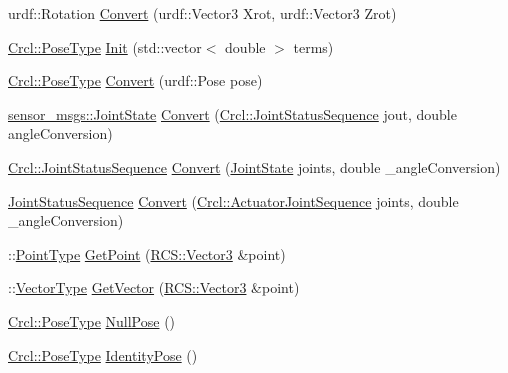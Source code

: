 \begin{DoxyCompactItemize}
\item 
urdf\-::\-Rotation \hyperlink{namespaceCrcl_af82af80892b5c9a1f843bbfabd06de91}{Convert} (urdf\-::\-Vector3 Xrot, urdf\-::\-Vector3 Zrot)
\item 
\hyperlink{namespaceCrcl_acc6c82b52280f4d0e74b82a92400956e}{Crcl\-::\-Pose\-Type} \hyperlink{namespaceCrcl_ae1dd6fda9cf860d4e66b55bdc9564795}{Init} (std\-::vector$<$ double $>$ terms)
\item 
\hyperlink{namespaceCrcl_acc6c82b52280f4d0e74b82a92400956e}{Crcl\-::\-Pose\-Type} \hyperlink{namespaceCrcl_a3fe26b022a84b7c961e1b77c6c148d6d}{Convert} (urdf\-::\-Pose pose)
\item 
\hyperlink{RCS_8h_aa4adb93a26caa4dacba9c9614e283245}{sensor\-\_\-msgs\-::\-Joint\-State} \hyperlink{namespaceCrcl_a650d91db3abf7d3734f8a0e4aceaeaea}{Convert} (\hyperlink{namespaceCrcl_a8e2d423195eeffb85b45b63f595f2825}{Crcl\-::\-Joint\-Status\-Sequence} jout, double angle\-Conversion)
\item 
\hyperlink{namespaceCrcl_a8e2d423195eeffb85b45b63f595f2825}{Crcl\-::\-Joint\-Status\-Sequence} \hyperlink{namespaceCrcl_a2a88d5186b3c539f968de637937294fb}{Convert} (\hyperlink{RCS_8h_aa4adb93a26caa4dacba9c9614e283245}{Joint\-State} joints, double \-\_\-angle\-Conversion)
\item 
\hyperlink{namespaceCrcl_a8e2d423195eeffb85b45b63f595f2825}{Joint\-Status\-Sequence} \hyperlink{namespaceCrcl_aa0e865c06943bf013c06bdc6fa538760}{Convert} (\hyperlink{namespaceCrcl_af084766e8e2d38a135cc67ef54d9904d}{Crcl\-::\-Actuator\-Joint\-Sequence} joints, double \-\_\-angle\-Conversion)
\item 
\-::\hyperlink{namespaceCrcl_a04f09d617642257f5938e52cee2feeef}{Point\-Type} \hyperlink{namespaceCrcl_a7c1e0abc6b119a3e7f51df0c9c288542}{Get\-Point} (\hyperlink{namespaceRCS_a3d2e4673086277ee114b9f01ba1664e7}{R\-C\-S\-::\-Vector3} \&point)
\item 
\-::\hyperlink{namespaceCrcl_ae868d4ece511d1485ed5d9118395aef8}{Vector\-Type} \hyperlink{namespaceCrcl_a2544b3f8bf6f3a8948ebd8080d0ee315}{Get\-Vector} (\hyperlink{namespaceRCS_a3d2e4673086277ee114b9f01ba1664e7}{R\-C\-S\-::\-Vector3} \&point)
\item 
\hyperlink{namespaceCrcl_acc6c82b52280f4d0e74b82a92400956e}{Crcl\-::\-Pose\-Type} \hyperlink{namespaceCrcl_aa4ed1cb04b5173a5bd4a115d4755a2db}{Null\-Pose} ()
\item 
\hyperlink{namespaceCrcl_acc6c82b52280f4d0e74b82a92400956e}{Crcl\-::\-Pose\-Type} \hyperlink{namespaceCrcl_ac77c1d8cdd8c33effcb7a3705671d06b}{Identity\-Pose} ()

\end{DoxyCompactItemize}

